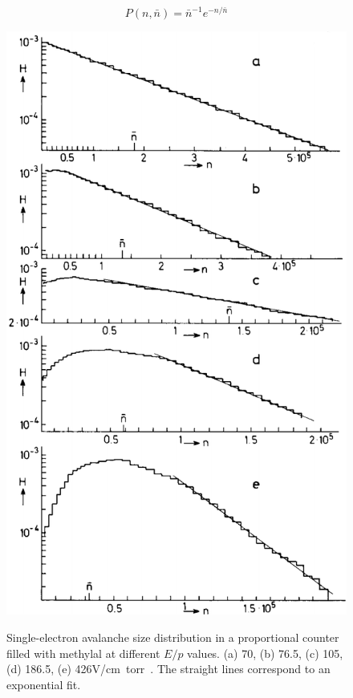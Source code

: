 	\begin{equation}
	\label{eq:FurryGenz}
	P(n,\bar{n}) = \bar{n}^{-1} e^{-n/\bar{n}}
	\end{equation}
	
\begingroup\setlength{\intextsep}{0pt}\setlength{\columnsep}{15pt}
	
	\begin{figure}
		\centering
		\includegraphics[width = \linewidth]{fig/chapt3/Genz1973.png}\\
		\caption{\label{fig:genz} Single-electron avalanche size distribution in a proportional counter filled with methylal at different $E/p$ values. (a) 70, (b) 76.5, (c) 105, (d) 186.5, (e) 426\si{V/cm.torr}~\cite{GENZ1973}. The straight lines correspond to an exponential fit.}
	\end{figure}
	
